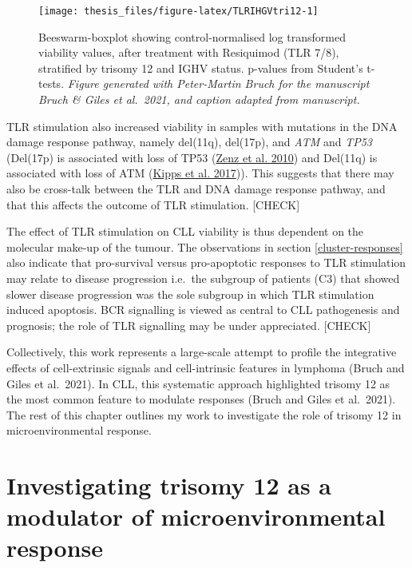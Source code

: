 \documentclass[11pt, a4paper, twosided]{book}
\begin{document}
\begin{figure}

{\centering \texttt{[image: thesis\_files/figure-latex/TLRIHGVtri12-1]} 

}

\caption{Beeswarm-boxplot showing control-normalised log transformed viability values, after treatment with Resiquimod (TLR 7/8), stratified by trisomy 12 and IGHV status. p-values from Student's t-tests. \emph{Figure generated with Peter-Martin Bruch for the manuscript Bruch \& Giles et al.~2021, and caption adapted from manuscript.}}\label{fig:TLRIHGVtri12}
\end{figure}
TLR stimulation also increased viability in samples with mutations in the DNA damage response pathway, namely del(11q), del(17p), and \emph{ATM} and \emph{TP53} (Del(17p) is associated with loss of TP53 (\protect\hyperlink{ref-Zenz2010}{Zenz et al. 2010}) and Del(11q) is associated with loss of ATM (\protect\hyperlink{ref-Kipps2017}{Kipps et al. 2017})). This suggests that there may also be cross-talk between the TLR and DNA damage response pathway, and that this affects the outcome of TLR stimulation. {[}CHECK{]}

The effect of TLR stimulation on CLL viability is thus dependent on the molecular make-up of the tumour. The observations in section \ref{cluster-responses} also indicate that pro-survival versus pro-apoptotic responses to TLR stimulation may relate to disease progression i.e.~the subgroup of patients (C3) that showed slower disease progression was the sole subgroup in which TLR stimulation induced apoptosis. BCR signalling is viewed as central to CLL pathogenesis and prognosis; the role of TLR signalling may be under appreciated. {[}CHECK{]}

Collectively, this work represents a large-scale attempt to profile the integrative effects of cell-extrinsic signals and cell-intrinsic features in lymphoma (Bruch and Giles et al.~2021). In CLL, this systematic approach highlighted trisomy 12 as the most common feature to modulate responses (Bruch and Giles et al.~2021). The rest of this chapter outlines my work to investigate the role of trisomy 12 in microenvironmental response.

\hypertarget{investigating-trisomy-12-as-a-modulator-of-microenvironmental-response}{%
\section{Investigating trisomy 12 as a modulator of microenvironmental response}\label{investigating-trisomy-12-as-a-modulator-of-microenvironmental-response}}
\end{document}
